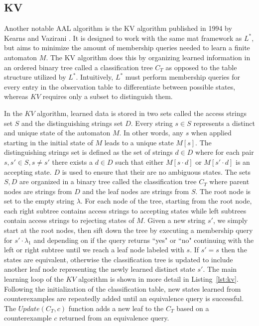 \subsection{KV}
Another notable AAL algorithm is the KV algorithm published in 1994 by Kearns and Vazirani \cite{KV1994}. It is designed to work with the same \ac{mat} framework as $L^*$, but aims to minimize the amount of membership queries needed to learn a finite automaton $M$. The KV algorithm does this by organizing learned information in an ordered binary tree called a classification tree $C_T$ as opposed to the table structure utilized by $L^*$. Intuitively, $L^*$ must perform membership queries for every entry in the observation table to differentiate between possible states, whereas $KV$ requires only a subset to distinguish them. 

In the $KV$ algorithm, learned data is stored in two sets called the access strings set $S$ and the distinguishing strings set $D$. Every string $s \in S$ represents a distinct and unique state of the automaton $M$. In other words, any $s$ when applied starting in the initial state of $M$ leads to a unique state $M[s]$. The distinguishing strings set is defined as the set of strings $d \in D$ where for each pair $s,s' \in S, s \neq s'$ there exists a $d \in D$ such that either $M[s \cdot d]$ or $M[s' \cdot d]$ is an accepting state. $D$ is used to ensure that their are no ambiguous states. The sets $S,D$ are organized in a binary tree called the classification tree $C_T$ where parent nodes are strings from $D$ and the leaf nodes are strings from $S$. The root node is set to the empty string $\lambda$. For each node of the tree, starting from the root node, each right subtree contains access strings to accepting states while left subtrees contain access strings to rejecting states of $M$.
Given a new string $s'$, we simply start at the root nodes, then sift down the tree by executing a membership query for $s' \cdot \lambda_1$ and depending on if the query returns ``yes" or ``no" continuing with the left or right subtree until we reach a leaf node labeled with $s$. If $s' = s$ then the states are equivalent, otherwise the classification tree is updated to include another leaf node representing the newly learned distinct state $s'$. The main learning loop of the $KV$ algorithm is shown in more detail in Listing~\ref{lst:kv}. Following the initialization of the classification table, new states learned from counterexamples are repeatedly added until an equivalence query is successful. The $Update(C_T,c)$ function adds a new leaf to the $C_T$ based on a counterexample $c$ returned from an equivalence query.

